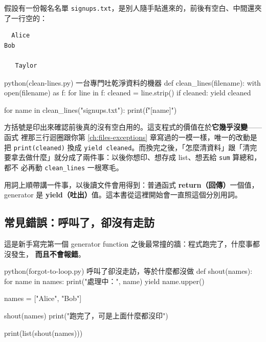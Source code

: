 假設有一份報名名單 \texttt{signups.txt}，是別人隨手貼進來的，前後有空白、中間還夾了一行空的：

\begin{verbatim}
  Alice
Bob

   Taylor
\end{verbatim}

\begin{example}{python}{(clean-lines.py) 一台專門吐乾淨資料的機器}
def clean_lines(filename):
    with open(filename) as f:
        for line in f:
            cleaned = line.strip()
            if cleaned:
                yield cleaned


for name in clean_lines("signups.txt"):
    print(f"[{name}]")
\end{example}

\iosample{}{[Alice] \\{} [Bob] \\{} [Taylor] \\}

方括號是印出來確認前後真的沒有空白用的。這支程式的價值在於\textbf{它幾乎沒變}——函式
裡那三行迴圈跟你第 \ref{ch:files-exceptions} 章寫過的一模一樣，唯一的改動是把
\texttt{print(cleaned)} 換成 \texttt{yield cleaned}。而換完之後，「怎麼清資料」跟「清完
要拿去做什麼」就分成了兩件事：以後你想印、想存成 list、想丟給 \texttt{sum} 算總和，都不
必再動 \texttt{clean\_lines} 一根寒毛。

用詞上順帶講一件事，以後讀文件會用得到：普通函式 \textbf{return（回傳）}一個值，
generator 是 \textbf{yield（吐出）}值。這本書從這裡開始會一直照這個分別用詞。

\subsection*{常見錯誤：呼叫了，卻沒有走訪}

這是新手寫完第一個 generator function 之後最常撞的牆：程式跑完了，什麼事都沒發生，
\textbf{而且不會報錯}。

\begin{example}{python}{(forgot-to-loop.py) 呼叫了卻沒走訪，等於什麼都沒做}
def shout(names):
    for name in names:
        print("處理中：", name)
        yield name.upper()


names = ["Alice", "Bob"]

shout(names)
print("跑完了，可是上面什麼都沒印")

print(list(shout(names)))
\end{example}


